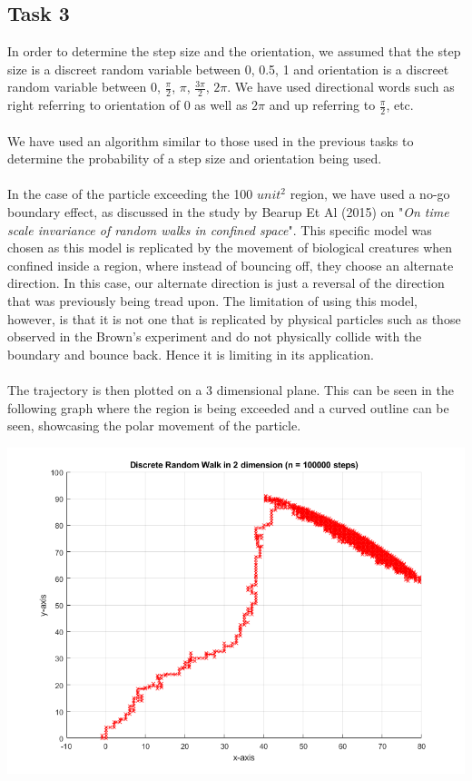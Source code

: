 \documentclass{article}
\begin{document}
\subsection{Task 3}
In order to determine the step size and the orientation, we assumed that the step size is a discreet random variable between {0, 0.5, 1} and orientation is a discreet random variable between {0, $\frac{\pi}{2}$, $\pi$, $\frac{3\pi}{2}$, $2\pi$}. We have used directional words such as right referring to orientation of 0 as well as $2\pi$ and up referring to $\frac{\pi}{2}$, etc. 
\\\\
We have used an algorithm similar to those used in the previous tasks to determine the probability of a step size and orientation being used. 
\\\\
In the case of the particle exceeding the 100 $unit^{2}$ region, we have used a no-go boundary effect, as discussed in the study by Bearup Et Al (2015) on "\textit{On time scale invariance of random walks in confined space}". This specific model was chosen as this model is replicated by the movement of biological creatures when confined inside a region, where instead of bouncing off, they choose an alternate direction. In this case, our alternate direction is just a reversal of the direction that was previously being tread upon. The limitation of using this model, however, is that it is not one that is replicated by physical particles such as those observed in the Brown's experiment and do not physically collide with the boundary and bounce back. Hence it is limiting in its application.
\\\\
The trajectory is then plotted on a 3 dimensional plane. This can be seen in the following graph where the region is being exceeded and a curved outline can be seen, showcasing the polar movement of the particle.
\begin{center}
    \includegraphics[scale = 0.5]{task3bounce.png}
\end{center}
\end{document}
